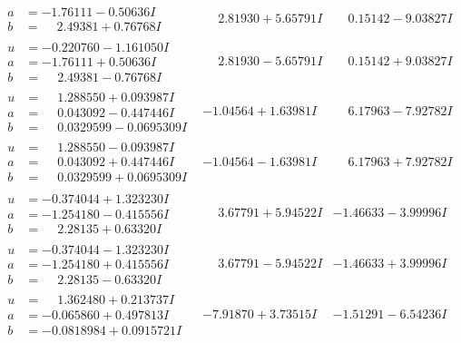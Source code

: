 \documentclass[1p]{elsarticle_modified}
\theoremstyle{definition}
\begin{document}
$$\begin{array}{c|c|c}
\begin{aligned}
a &= -1.76111 - 0.50636 I \\
b &= \phantom{-}2.49381 + 0.76768 I\end{aligned}
 & \phantom{-}2.81930 + 5.65791 I & \phantom{-}0.15142 - 9.03827 I \\ \hline\begin{aligned}
u &= -0.220760 - 1.161050 I \\
a &= -1.76111 + 0.50636 I \\
b &= \phantom{-}2.49381 - 0.76768 I\end{aligned}
 & \phantom{-}2.81930 - 5.65791 I & \phantom{-}0.15142 + 9.03827 I \\ \hline\begin{aligned}
u &= \phantom{-}1.288550 + 0.093987 I \\
a &= \phantom{-}0.043092 - 0.447446 I \\
b &= \phantom{-}0.0329599 - 0.0695309 I\end{aligned}
 & -1.04564 + 1.63981 I & \phantom{-}6.17963 - 7.92782 I \\ \hline\begin{aligned}
u &= \phantom{-}1.288550 - 0.093987 I \\
a &= \phantom{-}0.043092 + 0.447446 I \\
b &= \phantom{-}0.0329599 + 0.0695309 I\end{aligned}
 & -1.04564 - 1.63981 I & \phantom{-}6.17963 + 7.92782 I \\ \hline\begin{aligned}
u &= -0.374044 + 1.323230 I \\
a &= -1.254180 - 0.415556 I \\
b &= \phantom{-}2.28135 + 0.63320 I\end{aligned}
 & \phantom{-}3.67791 + 5.94522 I & -1.46633 - 3.99996 I \\ \hline\begin{aligned}
u &= -0.374044 - 1.323230 I \\
a &= -1.254180 + 0.415556 I \\
b &= \phantom{-}2.28135 - 0.63320 I\end{aligned}
 & \phantom{-}3.67791 - 5.94522 I & -1.46633 + 3.99996 I \\ \hline\begin{aligned}
u &= \phantom{-}1.362480 + 0.213737 I \\
a &= -0.065860 + 0.497813 I \\
b &= -0.0818984 + 0.0915721 I\end{aligned}
 & -7.91870 + 3.73515 I & -1.51291 - 6.54236 I \\ \hline\begin{aligned}

\end{aligned}
\end{array}$$
\end{document}
